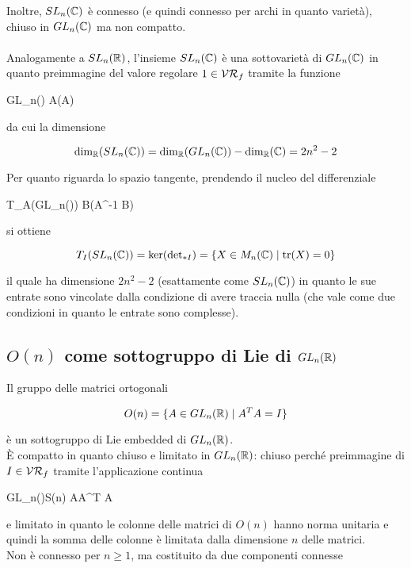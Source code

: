 Inoltre, $ SL_{n}(\mathbb{C}) $ è connesso (e quindi connesso per archi in quanto varietà), chiuso in $ GL_{n}(\mathbb{C}) $ ma non compatto.\\\\
%
Analogamente a $ SL_{n}(\mathbb{R}) $, l'insieme $ SL_{n}(\mathbb{C}) $ è una sottovarietà di $ GL_{n}(\mathbb{C}) $ in quanto preimmagine del valore regolare $ 1 \in \mathcal{VR}_{f} $ tramite la funzione

	{GL_{n}(\C)}{\C}
	{A}{\det(A)}

da cui la dimensione

\begin{equation}
	\dim_{\mathbb{R}}(SL_{n}(\mathbb{C})) = \dim_{\mathbb{R}}(GL_{n}(\mathbb{C})) - \dim_{\mathbb{R}}(\mathbb{C}) = 2 n^{2} - 2
\end{equation}

Per quanto riguarda lo spazio tangente, prendendo il nucleo del differenziale

	{T_{A}(GL_{n}(\C))}{\C}
	{B}{\tr(A^{-1} B)}

si ottiene

\begin{equation}
	T_{I}(SL_{n}(\mathbb{C})) = \ker(\operatorname{det}_{*I}) = \{ X \in M_{n}(\mathbb{C}) \mid \tr(X) = 0 \}
\end{equation}

il quale ha dimensione $ 2 n^{2} - 2 $ (esattamente come $ SL_{n}(\mathbb{C}) $) in quanto le sue entrate sono vincolate dalla condizione di avere traccia nulla (che vale come due condizioni in quanto le entrate sono complesse).

\subsection{$ O(n) $ come sottogruppo di Lie di $ GL_{n}(\mathbb{R}) $}

Il gruppo delle matrici ortogonali

\begin{equation}
	O(n) = \{ A \in GL_{n}(\mathbb{R}) \mid A^{T} A = I \}
\end{equation}

è un sottogruppo di Lie embedded di $ GL_{n}(\mathbb{R}) $.\\
È compatto in quanto chiuso e limitato in $ GL_{n}(\mathbb{R}) $: chiuso perché preimmagine di $ I \in \mathcal{VR}_{f} $ tramite l'applicazione continua
	
	{GL_{n}(\R)}{S(n)}
	{A}{A^{T} A}
	
e limitato in quanto le colonne delle matrici di $ O(n) $ hanno norma unitaria e quindi la somma delle colonne è limitata dalla dimensione $ n $ delle matrici.\\
Non è connesso per $ n \geqslant 1 $, ma costituito da due componenti connesse

